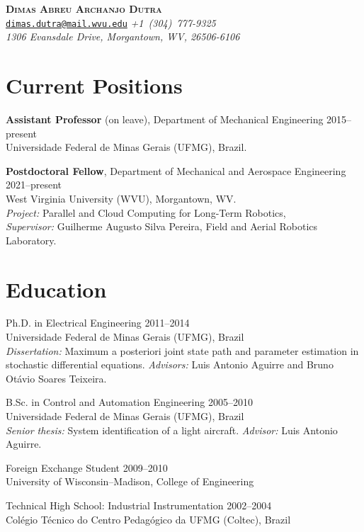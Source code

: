 \documentclass[a4paper, 11pt, oneside]{memoir}
\begin{document}
\thispagestyle{plain}

\begin{center}
  {
    \LARGE \bfseries \scshape 
    Dimas Abreu Archanjo Dutra
  }
  \\[1ex]
  \small
  \texttt{\href{mailto:dimas.dutra@mail.wvu.edu}{dimas.dutra@mail.wvu.edu}}
  \itshape\qquad
  +1~(304)~777-9325
  \\
  1306 Evansdale Drive, Morgantown, WV, 26506-6106
\end{center}

\section{Current Positions}

\begin{description}
\item \textbf{Assistant Professor} (on leave), 
  Department of Mechanical Engineering
  \hfill 2015--present
  \\
  Universidade Federal de Minas Gerais (UFMG), Brazil.

\item \textbf{Postdoctoral Fellow}, 
  Department of Mechanical and Aerospace Engineering
  \hfill 2021--present
  \\
  West Virginia University (WVU), Morgantown, WV. 
  \\
  \emph{Project:} Parallel and Cloud Computing for Long-Term Robotics,
  \\
  \emph{Supervisor:} Guilherme Augusto Silva Pereira, 
  Field and Aerial Robotics Laboratory.
\end{description}

\section{Education}
\begin{description}
\item Ph.D. in Electrical Engineering \hfill 2011--2014
  \\
  Universidade Federal de Minas Gerais (UFMG), Brazil
  \\
  \emph{Dissertation:} Maximum a posteriori joint state path and
  parameter estimation in stochastic differential equations.
  \emph{Advisors:} Luis Antonio Aguirre and Bruno Otávio Soares Teixeira.

\item B.Sc. in Control and Automation Engineering
  \hfill 2005--2010
  \\
  Universidade Federal de Minas Gerais (UFMG), Brazil
  \\
  \textit{Senior thesis:} System identification of a light aircraft.
  \emph{Advisor:} Luis Antonio Aguirre.
\item Foreign Exchange Student \hfill 2009--2010
  \\
  University of Wisconsin--Madison, College of Engineering
\item Technical High School: Industrial Instrumentation \hfill 2002--2004
  \\
  Colégio Técnico do Centro Pedagógico da UFMG (Coltec), Brazil
\end{description}
\end{document}
